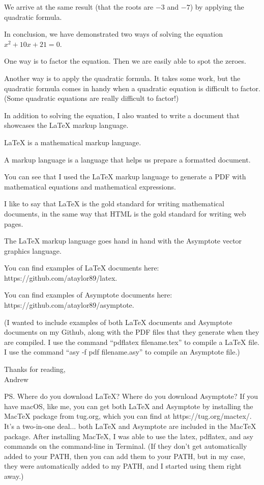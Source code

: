\documentclass{article}
\begin{document}
We arrive at the same result (that the roots are $-3$ and $-7$) by applying the quadratic formula.

In conclusion, we have demonstrated two ways of solving the equation $x^2 + 10x + 21 = 0$.

One way is to factor the equation. Then we are easily able to spot the zeroes.

Another way is to apply the quadratic formula. It takes some work, but the quadratic formula comes in handy when a quadratic equation is difficult to factor. (Some quadratic equations are really difficult to factor!)

In addition to solving the equation, I also wanted to write a document that showcases the LaTeX markup language.

LaTeX is a mathematical markup language.

A markup language is a language that helps us prepare a formatted document.

You can see that I used the LaTeX markup language to generate a PDF with mathematical equations and mathematical expressions.

I like to say that LaTeX is the gold standard for writing mathematical documents, in the same way that HTML is the gold standard for writing web pages.

The LaTeX markup language goes hand in hand with the Asymptote vector graphics language.

You can find examples of LaTeX documents here: https://github.com/ataylor89/latex.

You can find examples of Asymptote documents here: https://github.com/ataylor89/asymptote.

(I wanted to include examples of both LaTeX documents and Asymptote documents on my Github, along with the PDF files that they generate when they are compiled. I use the command ``pdflatex filename.tex'' to compile a LaTeX file. I use the command ``asy -f pdf filename.asy'' to compile an Asymptote file.)

Thanks for reading,\\
Andrew

PS. Where do you download LaTeX? Where do you download Asymptote? If you have macOS, like me, you can get both LaTeX and Asymptote by installing the MacTeX package from tug.org, which you can find at https://tug.org/mactex/. It's a two-in-one deal... both LaTeX and Asymptote are included in the MacTeX package. After installing MacTeX, I was able to use the latex, pdflatex, and asy commands on the command-line in Terminal. (If they don't get automatically added to your PATH, then you can add them to your PATH, but in my case, they were automatically added to my PATH, and I started using them right away.)
\end{document}
